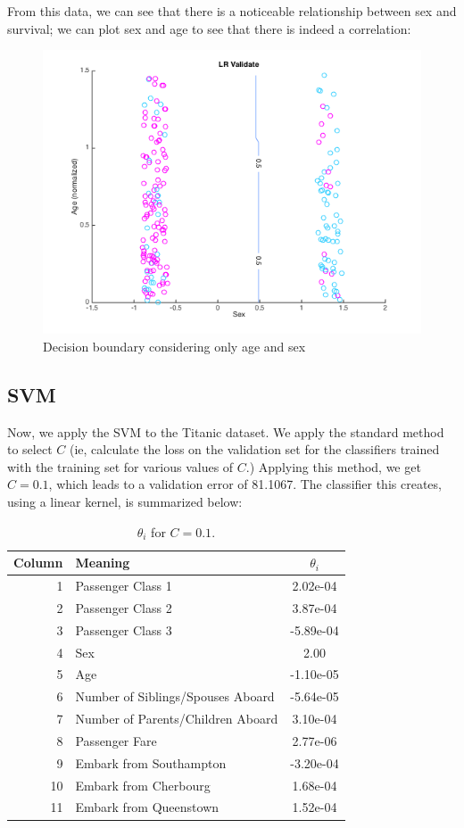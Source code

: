 \documentclass[10pt,letterpaper]{article}
\begin{document}
From this data, we can see that there is a noticeable relationship between sex and survival; we can plot sex and age to see that there is indeed a correlation:
\begin{figure}[!htb]
\begin{center}
\includegraphics[width=.5\linewidth]{figures/titanic45.png}
\caption{Decision boundary considering only age and sex}
\end{center}
\end{figure}
\subsection{SVM}
Now, we apply the SVM to the Titanic dataset. We apply the standard method to select $C$ (ie, calculate the loss on the validation set for the classifiers trained with the training set for various values of $C$.) Applying this method, we get $C = 0.1$, which leads to a validation error of 81.1067. The classifier this creates, using a linear kernel, is summarized below:

\begin{table}[!htb]
\centering
\caption{$\theta_i$ for $C = 0.1$.}
\begin{tabular}{rlc}
Column & Meaning                           & $\theta_i$\\ \hline
1      & Passenger Class 1                 & 2.02e-04  \\
2      & Passenger Class 2                 & 3.87e-04  \\
3      & Passenger Class 3                 & -5.89e-04 \\
4      & Sex                               & 2.00      \\
5      & Age                               & -1.10e-05 \\
6      & Number of Siblings/Spouses Aboard & -5.64e-05 \\
7      & Number of Parents/Children Aboard & 3.10e-04  \\
8      & Passenger Fare                    & 2.77e-06  \\
9      & Embark from Southampton           & -3.20e-04 \\
10     & Embark from Cherbourg             & 1.68e-04  \\
11     & Embark from Queenstown            & 1.52e-04  \\
\end{tabular}
\end{table}
\end{document}
